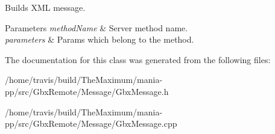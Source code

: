 Builds X\-M\-L message. 


\begin{DoxyParams}{Parameters}
{\em method\-Name} & Server method name. \\
\hline
{\em parameters} & Params which belong to the method. \\
\hline
\end{DoxyParams}


The documentation for this class was generated from the following files\-:\begin{DoxyCompactItemize}
\item 
/home/travis/build/\-The\-Maximum/mania-\/pp/src/\-Gbx\-Remote/\-Message/Gbx\-Message.\-h\item 
/home/travis/build/\-The\-Maximum/mania-\/pp/src/\-Gbx\-Remote/\-Message/Gbx\-Message.\-cpp\end{DoxyCompactItemize}

